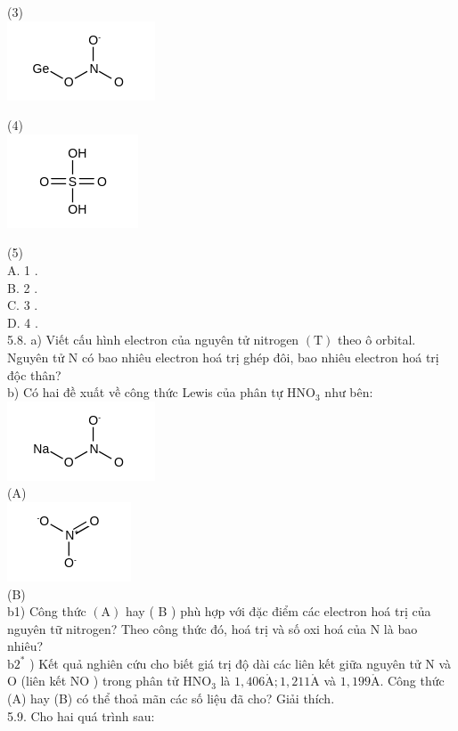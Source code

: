 \documentclass[10pt]{article}
\def\AA{\mathring{\mathrm{A}}}
\begin{document}
(3)\\
\includegraphics{smile-83155edbed62910f03cb988893df7ee3689e4167}

(4)\\
\includegraphics{smile-9fcf05af3e35e45f388cba59cf0161cabb37f389}

(5)\\
A. 1 .\\
B. 2 .\\
C. 3 .\\
D. 4 .\\
5.8. a) Viết cấu hình electron của nguyên tử nitrogen $(\mathrm{T})$ theo ô orbital. Nguyên tử N có bao nhiêu electron hoá trị ghép đôi, bao nhiêu electron hoá trị độc thân?\\
b) Có hai đề xuất về công thức Lewis của phân tự $\mathrm{HNO}_{3}$ như bên:\\
\includegraphics{smile-7a123878913c2d837f7c82071f77429838af884a}\\
(A)\\
\includegraphics{smile-627b27d25b0f6ece64194fe4d9e46228335f3220}\\
(B)\\
b1) Công thức $(\mathrm{A})$ hay ( B ) phù hợp với đặc điểm các electron hoá trị của nguyên tữ nitrogen? Theo công thức đó, hoá trị và số oxi hoá của N là bao nhiêu?\\
$\mathrm{b} 2^{*}$ ) Kết quả nghiên cứu cho biết giá trị độ dài các liên kết giữa nguyên tử N và O (liên kết NO ) trong phân tử $\mathrm{HNO}_{3}$ là $1,406 \AA ; 1,211 \AA$ và $1,199 \AA$. Công thức (A) hay (B) có thể thoả mãn các số liệu đã cho? Giải thích.\\
5.9. Cho hai quá trình sau:
\end{document}
